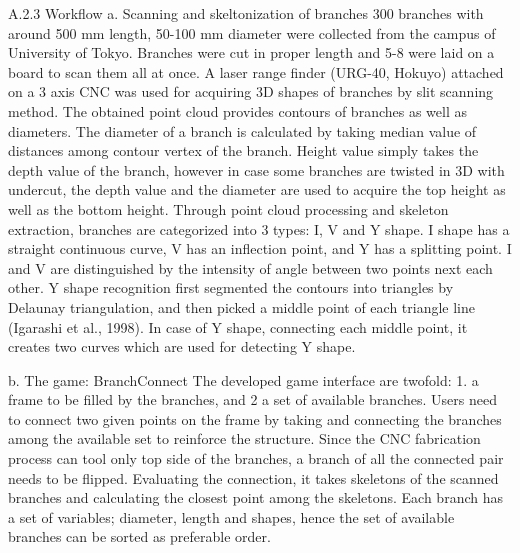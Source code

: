 A.2.3 Workflow
a. Scanning and skeltonization of branches
300 branches with around 500 mm length, 50-100 mm diameter were collected from the campus of University of Tokyo. Branches were cut in proper length and 5-8 were laid on a board to scan them all at once. A laser range finder (URG-40, Hokuyo) attached on a 3 axis CNC was used for acquiring 3D shapes of branches by slit scanning method. 
	The obtained point cloud provides contours of branches as well as diameters. The diameter of a branch is calculated by taking median value of distances among contour vertex of the branch. Height value simply takes the depth value of the branch, however in case some branches are twisted in 3D with undercut, the depth value and the diameter are used to acquire the top height as well as the bottom height. Through point cloud processing and skeleton extraction, branches are categorized into 3 types: I, V and Y shape. I shape has a straight continuous curve, V has an inflection point, and Y has a splitting point. I and V are distinguished by the intensity of angle between two points next each other. Y shape recognition first segmented the contours into triangles by Delaunay triangulation, and then picked a middle point of each triangle line (Igarashi et al., 1998). In case of Y shape, connecting each middle point, it creates two curves which are used for detecting Y shape. 

b. The game: BranchConnect
The developed game interface are twofold: 1. a frame to be filled by the branches, and 2 a set of available branches. Users need to connect two given points on the frame by taking and connecting the branches among the available set to reinforce the structure. Since the CNC fabrication process can tool only top side of the branches, a branch of all the connected pair needs to be flipped. Evaluating the connection, it takes skeletons of the scanned branches and calculating the closest point among the skeletons. Each branch has a set of variables; diameter, length and shapes, hence the set of available branches can be sorted as preferable order. 
	
